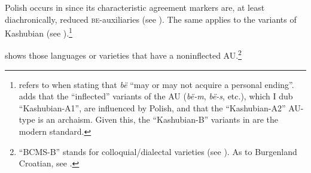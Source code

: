 \documentclass[output=paper]{langscibook}
\begin{document}
Polish occurs in  since its characteristic agreement markers are, at least diachronically, reduced \textsc{be}-auxiliaries (see ). The same applies to the variants of Kashubian (see ).\footnote{\citet[778]{Stone1993} refers to \citet[134]{BrezaTreder1981} when stating that \textit{bë} ``may or may not acquire a personal ending''. \citet[392--393]{Dulicenko2005} adds that the ``inflected'' variants of the AU (\textit{bë-m}, \textit{bë-s}, etc.), which I dub ``Kashubian-A1'', are influenced by Polish, and that the ``Kashubian-A2'' AU-type is an archaism. Given this, the ``Kashubian-B'' variants in  are the modern standard.}

 shows those languages or varieties that have a noninflected AU.\footnote{``BCMS-B'' stands for colloquial/dialectal varieties (see \cites[39]{Panzer1967}[105]{Kramer1986}[253]{Browne2004}[276]{Xrakovskij2009}). As to Burgenland Croatian, see \citet[240]{Tornow2002}.}

\end{document}
